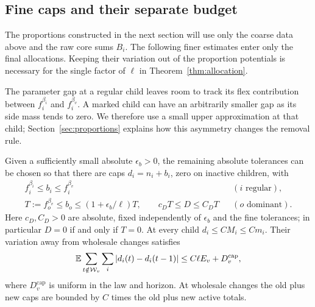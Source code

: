 \subsection{Fine caps and their separate budget}

The proportions constructed in the next section will use only the
coarse data above and the raw core sums $B_i$.  The following finer
estimates enter only the final allocations.  Keeping their variation
out of the proportion potentials is necessary for the single factor
of $\ell$ in Theorem~\ref{thm:allocation}.

The parameter gap at a regular child leaves room to track its flex
contribution between $f_i^{\beta_i}$ and $f_i^{\beta_v}$.  A marked
child can have an arbitrarily smaller gap as its side mass tends to
zero.  We therefore use a small upper approximation at that child;
Section~\ref{sec:proportions} explains how this asymmetry changes the
removal rule.

\begin{lemma}[Caps]\label{lem:caps}
Given a sufficiently small absolute $\epsilon_b>0$, the remaining
absolute tolerances can be chosen so that there are caps
$d_i=n_i+b_i$, zero on inactive children, with
\begin{equation}\label{eq:cap-feasibility}
 \begin{aligned}
 f_i^{\beta_i}\le b_i\le f_i^{\beta_v}
                                      &&(i\text{ regular}),\\
 T:=f_o^{\beta_v}\le b_o\le(1+\epsilon_b/\ell)T,
 \qquad c_DT\le D\le C_DT
                                      &&(o\text{ dominant}).
 \end{aligned}
\end{equation}
Here $c_D,C_D>0$ are absolute, fixed independently of
$\epsilon_b$ and the fine tolerances; in particular $D=0$ if and only
if $T=0$.  At every child $d_i\le C M_i\le C m_i$.
Their variation away from wholesale changes satisfies
\begin{equation}\label{eq:fine-cap-budget}
 \mathbb E\sum_{t\notin\mathcal W_v}\sum_i|d_i(t)-d_i(t-1)|
          \le C\ell E_v+D_v^{\mathrm{cap}},
\end{equation}
where $D_v^{\mathrm{cap}}$ is uniform in the law and horizon.
At wholesale changes the old plus new caps are bounded by $C$ times
the old plus new active totals.
\end{lemma}

